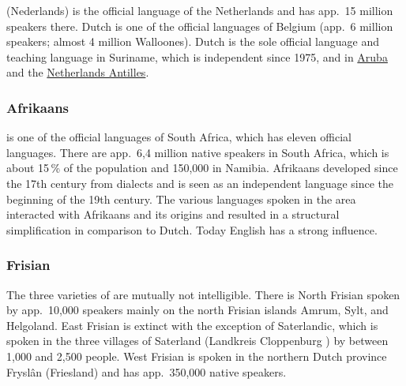  (Nederlands) is the  official language of the Netherlands and has app.\, 15 million speakers
there. Dutch is one of the official languages of Belgium (app.\ 6 million speakers; almost 4 million
Walloones). Dutch is the sole official language and teaching language in Suriname, which is
independent since 1975, 
and in \href{https://en.wikipedia.org/wiki/Aruba}{Aruba} and the \href{https://en.wikipedia.org/wiki/Netherlands_Antilles}{Netherlands Antilles}.


\subsubsection{Afrikaans}

 is one of the official languages of South Africa, which has eleven official languages.
There are app.\ 6,4 million native speakers in South Africa, which is about 15\,\% of the population
and 150,000 in Namibia. Afrikaans developed since the 17th century from  dialects and is seen
as an independent language since the beginning of the 19th century. The various languages spoken in
the area interacted with Afrikaans and its origins and resulted in a structural simplification in
comparison to Dutch. Today English has a strong influence.



\subsubsection{Frisian}

The three varieties of  are mutually not intelligible. There is North Frisian spoken by
app.\ 10,000 speakers mainly on the north Frisian islands Amrum, Sylt, and Helgoland. East Frisian
is extinct with the exception of Saterlandic, which is spoken in the three villages of Saterland
(Landkreis Cloppenburg ) by between 1,000 and  2,500 people.
West Frisian is spoken in the northern Dutch province Fryslân (Friesland) and has app.\  350,000
native speakers.



